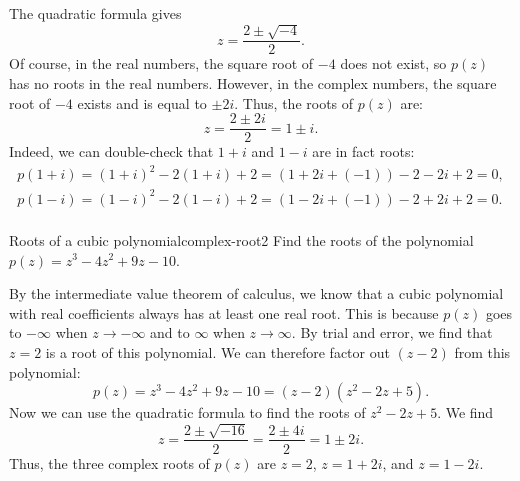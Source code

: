 \begin{solution}
  The quadratic formula gives
  \begin{equation*}
    z = \frac{2 \pm \sqrt{-4}}{2}.
  \end{equation*}
  Of course, in the real numbers, the square root of $-4$ does not
  exist, so $p(z)$ has no roots in the real numbers. However, in the
  complex numbers, the square root of $-4$ exists and is equal to
  $\pm2i$. Thus, the roots of $p(z)$ are:
  \begin{equation*}
    z = \frac{2 \pm 2i}{2} = 1\pm i.
  \end{equation*}
  Indeed, we can double-check that $1+i$ and $1-i$ are in fact roots:
  \begin{equation*}
    \begin{array}{ll}
      p(1+i) = (1+i)^2 - 2(1+i) + 2 = (1 + 2i + (-1)) - 2 - 2i + 2 = 0, \\
      p(1-i) = (1-i)^2 - 2(1-i) + 2 = (1 - 2i + (-1)) - 2 + 2i + 2 = 0. \\
    \end{array}
  \end{equation*}
  \vspace{-2ex}
\end{solution}

\begin{example}{Roots of a cubic polynomial}{complex-root2}
  Find the roots of the polynomial $p(z) = z^3 - 4z^2 + 9z - 10$.
\end{example}

\begin{solution}
  By the intermediate value theorem of calculus, we know that a cubic
  polynomial with real coefficients always has at least one real
  root. This is because $p(z)$ goes to $-\infty$ when $z\to-\infty$
  and to $\infty$ when $z\to\infty$. By trial and error, we find that
  $z=2$ is a root of this polynomial. We can therefore factor out
  $(z-2)$ from this polynomial:
  \begin{equation*}
    p(z) = z^3 - 4z^2 + 9z - 10 = (z-2)(z^2 - 2z + 5).
  \end{equation*}
  Now we can use the quadratic formula to find the roots of $z^2 - 2z
  + 5$. We find
  \begin{equation*}
    z = \frac{2\pm\sqrt{-16}}{2} = \frac{2\pm 4i}{2} = 1\pm 2i.
  \end{equation*}
  Thus, the three complex roots of $p(z)$ are $z=2$, $z=1+2i$, and $z=1-2i$.
\end{solution}

